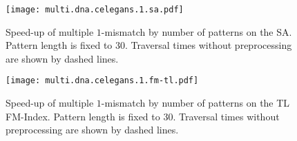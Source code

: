 \begin{figure}[t]
\begin{center}
\caption[Multiple $k$-mismatches speed-up on SA]{Speed-up of multiple $1$-mismatch by number of patterns on the SA. Pattern length is fixed to 30. Traversal times without preprocessing are shown by dashed lines.}
\label{fig:query-dna-apx-multi-sa}
\texttt{[image: multi.dna.celegans.1.sa.pdf]}
\end{center}
\end{figure}

\begin{figure}[b]
\begin{center}
\caption[Multiple $k$-mismatches speed-up on FM-index]{Speed-up of multiple $1$-mismatch by number of patterns on the TL FM-Index. Pattern length is fixed to 30. Traversal times without preprocessing are shown by dashed lines.}
\label{fig:query-dna-apx-multi-fmtl}
\texttt{[image: multi.dna.celegans.1.fm-tl.pdf]}
\end{center}
\end{figure}
